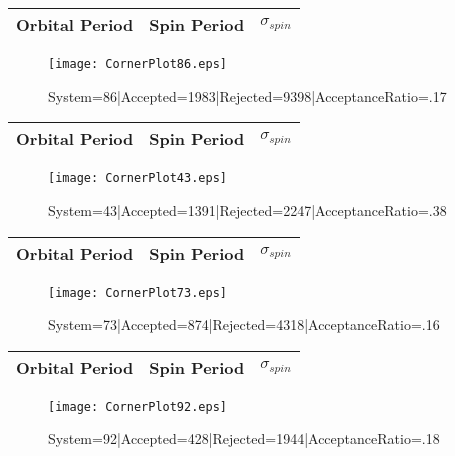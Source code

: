\documentclass[10pt]{article}
\begin{document}
\begin{center}
        \begin{tabular}{|c|c|c|}
        \hline
Orbital Period & Spin Period & $\sigma_{spin}$ \\
 \hline
        \end{tabular}
        \end{center}
\begin{figure}[h] 
        \texttt{[image: CornerPlot86.eps]}
        \caption{System=86|Accepted=1983|Rejected=9398|AcceptanceRatio=.17}
        \label{S86}
        \centering
        \end{figure}
\begin{center}
        \begin{tabular}{|c|c|c|}
        \hline
Orbital Period & Spin Period & $\sigma_{spin}$ \\
 \hline
        \end{tabular}
        \end{center}
\begin{figure}[h] 
        \texttt{[image: CornerPlot43.eps]}
        \caption{System=43|Accepted=1391|Rejected=2247|AcceptanceRatio=.38}
        \label{S43}
        \centering
        \end{figure}
\begin{center}
        \begin{tabular}{|c|c|c|}
        \hline
Orbital Period & Spin Period & $\sigma_{spin}$ \\
 \hline
        \end{tabular}
        \end{center}
\begin{figure}[h] 
        \texttt{[image: CornerPlot73.eps]}
        \caption{System=73|Accepted=874|Rejected=4318|AcceptanceRatio=.16}
        \label{S73}
        \centering
        \end{figure}
\begin{center}
        \begin{tabular}{|c|c|c|}
        \hline
Orbital Period & Spin Period & $\sigma_{spin}$ \\
 \hline
        \end{tabular}
        \end{center}
\begin{figure}[h] 
        \texttt{[image: CornerPlot92.eps]}
        \caption{System=92|Accepted=428|Rejected=1944|AcceptanceRatio=.18}
        \label{S92}
        \centering
        \end{figure}
\end{document}
